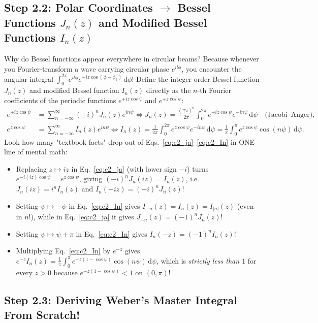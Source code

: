 \documentclass[10pt,letterpaper]{article}
\newcommand{\abs}[1]{\lvert #1 \rvert}
\newcommand{\dd}{\mathrm{d}}
\numberwithin{equation}{section}
\begin{document}
\subsection{Step 2.2: Polar Coordinates $\to$ Bessel Functions $J_n(z)$ and Modified Bessel Functions $I_n(z)$}

Why do Bessel functions appear everywhere in circular beams? Because whenever you Fourier-transform a wave carrying circular phase $e^{il\phi}$, you encounter the angular integral $\int_0^{2\pi} e^{il\phi} e^{-i z\cos(\phi-\phi_k)}\,\dd\phi$!
Define the integer-order Bessel function $J_n(z)$ and modified Bessel function $I_n(z)$ directly as the $n$-th Fourier coefficients of the periodic functions $e^{+iz\cos\psi}$ and $e^{+z\cos\psi}$:
\begin{align}
  e^{\pm i z\cos\psi} &= \sum_{n=-\infty}^\infty (\pm i)^n J_n(z) e^{in\psi}
  \iff J_n(z) = \frac{(\mp i)^n}{2\pi}\int_0^{2\pi} e^{\pm iz\cos\psi} e^{-in\psi}\,\dd\psi \quad\text{(Jacobi--Anger)},
  \label{eq:c2_ja} \\
  e^{z\cos\psi} &= \sum_{n=-\infty}^\infty I_n(z) e^{in\psi}
  \iff I_n(z) = \frac{1}{2\pi}\int_0^{2\pi} e^{z\cos\psi} e^{-in\psi}\,\dd\psi = \frac{1}{\pi}\int_0^\pi e^{z\cos\psi}\cos(n\psi)\,\dd\psi.
  \label{eq:c2_In}
\end{align}
Look how many "textbook facts" drop out of Eqs.~\eqref{eq:c2_ja}--\eqref{eq:c2_In} in ONE line of mental math:
\begin{itemize}[leftmargin=1.4em,itemsep=1pt,topsep=1pt]
  \item Replacing $z \mapsto iz$ in Eq.~\eqref{eq:c2_ja} (with lower sign $-i$) turns $e^{-i(iz)\cos\psi} = e^{z\cos\psi}$, giving $(-i)^n J_n(iz) = I_n(z)$, i.e.\ $J_n(iz) = i^n I_n(z)$ and $I_n(-iz) = (-i)^n J_n(z)$!
  \item Setting $\psi \mapsto -\psi$ in Eq.~\eqref{eq:c2_In} gives $I_{-n}(z) = I_n(z) = I_{\abs{n}}(z)$ (even in $n$!), while in Eq.~\eqref{eq:c2_ja} it gives $J_{-n}(z) = (-1)^n J_n(z)$!
  \item Setting $\psi \mapsto \psi + \pi$ in Eq.~\eqref{eq:c2_In} gives $I_n(-z) = (-1)^n I_n(z)$!
  \item Multiplying Eq.~\eqref{eq:c2_In} by $e^{-z}$ gives $e^{-z} I_n(z) = \frac{1}{\pi}\int_0^\pi e^{-z(1-\cos\psi)}\cos(n\psi)\,\dd\psi$, which is \emph{strictly less than $1$} for every $z > 0$ because $e^{-z(1-\cos\psi)} < 1$ on $(0,\pi)$!
\end{itemize}

\subsection{Step 2.3: Deriving Weber's Master Integral From Scratch!}
\end{document}
